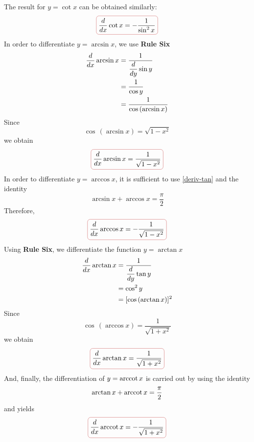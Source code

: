 \athr The result for $y = \cot x$ can be obtained similarly:
\begin{equation}%
\boxed{\ddx  \cot x = - \frac{1}{ \sin^{2} x} }
\label{deriv-tan}
\end{equation}
In order to differentiate $y = \arcsin x$, we use \textbf{Rule Six}
\begin{align*}%
\ddx \arcsin x & = \frac{1}{\dfrac{d}{dy} \sin y} \\
& = \frac{1}{\cos y} \\
& = \frac{1}{\cos \, (\arcsin x)}
\end{align*}
Since
\begin{equation*}%
\cos \, (\arcsin x) = \sqrt{1 - x^{2}}
\end{equation*}
 we obtain
\begin{equation}%
\boxed{\ddx  \arcsin x =  \frac{1}{ \sqrt{1 - x^{2} }}}
\label{deriv-arcsin}
\end{equation}
In order to differentiate $y = \arccos x$, it is sufficient to
use \eqref{deriv-tan} and the identity 
\begin{equation*}%
\arcsin x + \arccos x = \frac{\pi}{2}
\end{equation*}
Therefore,
\begin{equation}%
\boxed{\ddx  \arccos x = - \frac{1}{ \sqrt{1 - x^{2} }}}
\label{deriv-arccos}
\end{equation}
Using \textbf{Rule Six}, we differentiate the function $y = \arctan x$
\begin{align*}%
\ddx \arctan x & = \frac{1}{\dfrac{d}{dy} \tan y} \\
& = \cos^{2} y \\
& = [\cos \, (\arctan x)]^{2}
\end{align*}
Since 
\begin{equation*}%
\cos \, ( \arccos x ) = \frac{1}{ \sqrt{1 + x^{2}}}
\end{equation*}
we obtain
\begin{equation}%
\boxed{\ddx  \arctan x =  \frac{1}{ \sqrt{1 + x^{2} }}}
\label{deriv-arctan}
\end{equation}
And, finally, the differentiation of $y = \operatorname{arccot} x$ is carried out by using the identity
\begin{equation*}%
\arctan x + \arccot x = \frac{\pi}{2}
\end{equation*}
and yields
\begin{equation}%
\boxed{\ddx  \arccot x = - \frac{1}{ \sqrt{1 + x^{2} }}}
\label{deriv-arctan}
\end{equation}

